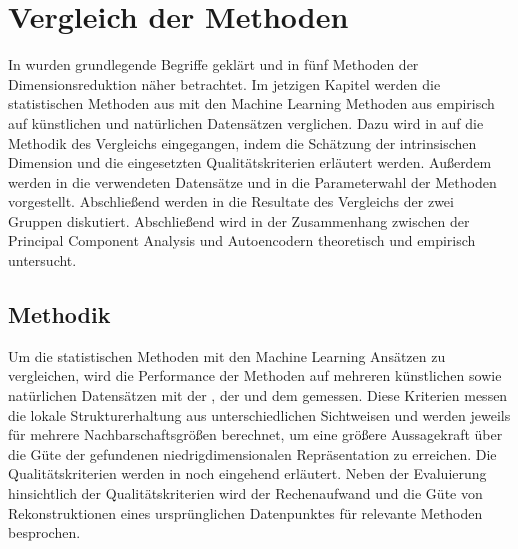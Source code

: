 \chapter{Vergleich der Methoden}
\label{ch:Vergleich}

In  wurden grundlegende Begriffe geklärt und in
 fünf Methoden der Dimensionsreduktion näher betrachtet. Im jetzigen
Kapitel werden die statistischen Methoden aus  mit den
Machine Learning Methoden aus  empirisch auf künstlichen und
natürlichen Datensätzen verglichen. Dazu wird in  auf die
Methodik des Vergleichs eingegangen, indem die Schätzung der intrinsischen Dimension und die
eingesetzten Qualitätskriterien erläutert werden. Außerdem werden in
 die verwendeten Datensätze und in
 die Parameterwahl der Methoden vorgestellt.
Abschließend werden in  die Resultate des Vergleichs der zwei
Gruppen diskutiert. Abschließend wird in  der
Zusammenhang zwischen der Principal Component Analysis und Autoencodern theoretisch und empirisch
untersucht.

\section{Methodik}
\label{ch:Vergleich:sec:Methodik}

Um die statistischen Methoden mit den Machine Learning Ansätzen zu vergleichen, wird die
Performance der Methoden auf mehreren künstlichen sowie natürlichen Datensätzen mit der
, der  und dem  gemessen. Diese Kriterien messen die lokale Strukturerhaltung aus unterschiedlichen
Sichtweisen und werden jeweils für mehrere Nachbarschaftsgrößen berechnet, um eine größere
Aussagekraft über die Güte der gefundenen niedrigdimensionalen Repräsentation zu erreichen. Die
Qualitätskriterien werden in  noch
eingehend erläutert. Neben der Evaluierung hinsichtlich der Qualitätskriterien wird der
Rechenaufwand und die Güte von Rekonstruktionen eines ursprünglichen Datenpunktes für relevante
Methoden besprochen.

